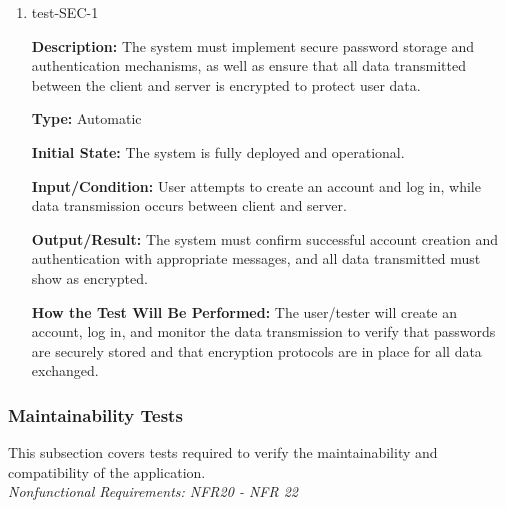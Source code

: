 \documentclass[12pt, titlepage]{article}
\begin{document}
\begin{enumerate}

\item{test-SEC-1\\}

\textbf{Description:} The system must implement secure password storage and authentication mechanisms, as well as ensure that all data transmitted between the client and server is encrypted to protect user data.

\textbf{Type:} Automatic
					
\textbf{Initial State:} The system is fully deployed and operational.
					
\textbf{Input/Condition:} User attempts to create an account and log in, while data transmission occurs between client and server.
					
\textbf{Output/Result:} The system must confirm successful account creation and authentication with appropriate messages, and all data transmitted must show as encrypted.
					
\textbf{How the Test Will Be Performed:} The user/tester will create an account, log in, and monitor the data transmission to verify that passwords are securely stored and that encryption protocols are in place for all data exchanged.

\end{enumerate}

\subsubsection{Maintainability Tests}

This subsection covers tests required to verify the maintainability and compatibility of the application. \\
\textit{Nonfunctional Requirements: NFR20 - NFR 22}
\end{document}
